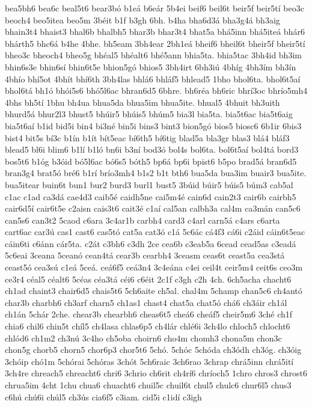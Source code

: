 {bea5bh6
bea6c
beal5t6
bear3bó
b1eá
b6eár
5b4ei
beif6
beil6t
beir5f
beir5tí
beo3c
beoch4
beo5itea
beo5m
3béit
b1f
b3gh
6bh.
b4ha
bha6d3á
bha3g4á
bh3aig
bhain3t4
bhaist3
bhal6b
bhalbh5
bhar3b
bhar3t4
bhat5a
bhá5inn
bhá5iteá
bhár6
bhárth5
bhc6á
b4he
4bhe.
bh5eam
3bh4ear
2bh1eá
bheif6
bheil6t
bheir5f
bheir5tí
bheo3c
bheoch4
bheo5g
bhéal5
bhéalt6
bhé5ann
bhia5ta.
bhia5tac
3bh4id
bh3im
bhin6s3e
bhin6sí
bhin6t5e
bhion5gó
bhios5
3bh4irt
6bh3iú
4bhíg
4bh3ím
bh3ín
4bhío
bhí5ot
4bhít
bhí6th
3bh4las
bhlá6
bhláf5
bhlead5
1bho
bhol6ta.
bhol6t5aí
bhol6tá
bh1ó
bhói5s6
bhó5l6ac
bhran6d5
6bhre.
bh6réa
bh6ric
bhrí3oc
bhrío5mh4
4bhs
bh5tí
1bhu
bh4ua
bhua5da
bhua5im
bhua5ite.
bhual5
4bhuit
bh3uith
bhurd5á
bhur2l3
bhust5
bhúir5
bhúis5
bhúm5
bia3l
bia5ta.
bia5t6ac
bia5t6aig
bia5t6aí
b1id
bid5i
bin4
bi3né
bin5i
bins3
bint3
bion5gó
bios5
biosc6
6b1ir
6bis3
bist4
bit5s
bí3c
b1ín
b1ít
bít5eac
bí6th5
bí6tig
blad5a
bla3gr
blas3
blá4
bláf3
blead5
bl6i
blim6
b1lí
b1ló
bn6i
b3ní
bod3ó
bol4s
bol6ta.
bol6t5aí
bol4tá
bord3
bos5t6
b1óg
b3óid
bó5l6ac
bó6s5
bóth5
bp6á
bp6i
bpist6
b5po
brad5á
bran6d5
bran3g4
brat5ó
bré6
b1rí
brío3mh4
b1s2
b1t
bth6
bua5da
bua3im
buair3
bua5ite.
bua5itear
buin6t
bun1
bur2
burd3
burl1
bust5
3búid
búir5
búis5
búm3
cab5al
c1ac
c1ad
ca3dá
cae4d3
caib5é
caidh5ne
cai5m4é
cain6d
cain2t3
cair6b
cairbh5
cair6d5í
cair6t5e
c2aisn
cais3t6
cait3é
c1aí
cal5an
calbh3a
cal4m
ca3mán
can5c6
can5s6
can3t2
5caod
c6ara
3c4ar1b
carbh4
card3
c4arl
carn5á
c4ars
c6arta
cart6ac
car3ú
cas1
cast6
cas5tó
cat5a
cat3ó
c1á
5c6ác
cá4f3
cá6i
c2áid
cáin6t5eac
cáin6ti
c6ánn
cár5ta.
c2át
c3bh6
c3dh
2ce
cea6b
c3eab5a
6cead
cead5as
c3eadá
5c6eai
3ceana
5ceanó
cean4tá
cear3b
cearbh4
3ceasm
ceas6t
ceast5a
cea3stá
ceast5ó
cea3sú
c1eá
5ceá.
ceá6f5
ceá3n4
3c4eána
c4ei
ceil4t
ceir5m4
ceit6s
ceo3m
ce3r4
céal5
céalt6
5céas
céa3tá
céi6
c6éit
2c1f
c3gh
c2h
4ch.
6ch5acha
chacht6
ch1ad
chaint3
chair6d5
chais5t6
5ch6aite
ch5al.
chal4m
5champ
chan5c6
ch4antó
char3b
charbh6
ch3arf
charn5
ch1as1
chast4
chat5a
chat5ó
chá6
ch3áir
ch1ál
ch1án
5chár
2che.
chear3b
chearbh6
cheas6t5
cheá6
cheáf5
cheir5m6
3ché
ch1f
chia6
chil6
chin5t
chíl5
ch4lasa
chlas6p5
ch4lár
chlé6i
3ch4lo
chloch5
chlocht6
chlód6
ch1m2
ch3nú
3c4ho
ch5oba
choirn6
cho4m
chomh3
chona5m
chon3c
chon5g
chorb5
chorn5
chor6p3
chor5t6
5chó.
5chóc
5chóda
ch3ódh
ch3óg.
ch3óig
3chóip
chó1m
5chórai
5chóras
3chót
5ch6raic
3ch6rao
3chrap
chrá5inn
chrá5ití
3ch4re
chreach5
chreacht6
chri6
3chrio
ch6rit
ch4rí6
chríoch5
1chro
chros3
chrost6
chrua5im
4cht
1chu
chua6
chuacht6
chuil5c
chuil6t
chul5
chulc6
chur6l5
chus3
c6hú
chú6i
chúl5
ch3ús
cia6f5
c3iam.
cid5i
c1idí
c3igh
}
